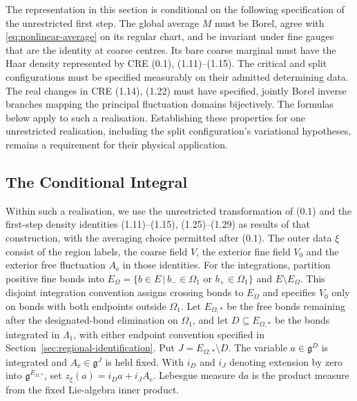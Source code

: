 \documentclass[11pt]{article}
\newcommand{\dd}{\mathrm{d}}
\begin{document}
The representation in this section is conditional on the following specification of the unrestricted first step. The global average $M$ must be Borel, agree with \eqref{eq:nonlinear-average} on its regular chart, and be invariant under fine gauges that are the identity at coarse centres. Its bare coarse marginal must have the Haar density represented by CRE (0.1), (1.11)--(1.15). The critical and split configurations must be specified measurably on their admitted determining data. The real changes in CRE (1.14), (1.22) must have specified, jointly Borel inverse branches mapping the principal fluctuation domains bijectively. The formulas below apply to such a realisation. Establishing these properties for one unrestricted realisation, including the split configuration's variational hypotheses, remains a requirement for their physical application.

\subsection{The Conditional Integral}

Within such a realisation, we use the unrestricted transformation of \cite{BalabanCRE} (0.1) and the first-step density identities (1.11)--(1.15), (1.25)--(1.29) as results of that construction, with the averaging choice permitted after (0.1). The outer data $\xi$ consist of the region labels, the coarse field $V$, the exterior fine field $V_0$ and the exterior free fluctuation $A_{\mathrm e}$ in those identities. For the integrations, partition positive fine bonds into $E_\Omega=\{b\in E\, | \,b_-\in\Omega_1\text{ or }b_+\in\Omega_1\}$ and $E\setminus E_\Omega$. This disjoint integration convention assigns crossing bonds to $E_\Omega$ and specifies $V_0$ only on bonds with both endpoints outside $\Omega_1$. Let $E_{\Omega,*}$ be the free bonds remaining after the designated-bond elimination on $\Omega_1$, and let $D\subseteq E_{\Omega,*}$ be the bonds integrated in $\Lambda_1$, with either endpoint convention specified in Section~\ref{sec:regional-identification}. Put $J=E_{\Omega,*}\setminus D$. The variable $a\in\mathfrak g^D$ is integrated and $A_{\mathrm e}\in\mathfrak g^J$ is held fixed. With $i_D$ and $i_J$ denoting extension by zero into $\mathfrak g^{E_{\Omega,*}}$, set $z_\xi(a)=i_Da+i_JA_{\mathrm e}$. Lebesgue measure $\dd a$ is the product measure from the fixed Lie-algebra inner product.
\end{document}
